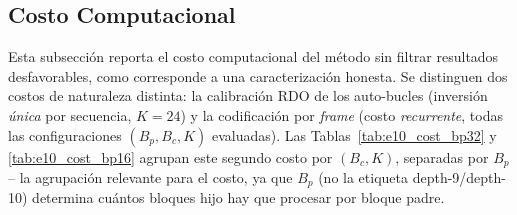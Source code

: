 
    \subsection{Costo Computacional}
        \label{sec:e10_multiframe_compute}

        Esta subsección reporta el costo computacional del método sin filtrar resultados
        desfavorables, como corresponde a una caracterización honesta. Se distinguen dos costos
        de naturaleza distinta: la calibración RDO de los auto-bucles (inversión \emph{única} por
        secuencia, $K=24$) y la codificación por \textit{frame} (costo \emph{recurrente}, todas
        las configuraciones $(B_p, B_c, K)$ evaluadas). Las Tablas~\ref{tab:e10_cost_bp32} y
        \ref{tab:e10_cost_bp16} agrupan este segundo costo por $(B_c, K)$, separadas por $B_p$
        -- la agrupación relevante para el costo, ya que $B_p$ (no la etiqueta depth-9/depth-10)
        determina cuántos bloques hijo hay que procesar por bloque padre.

